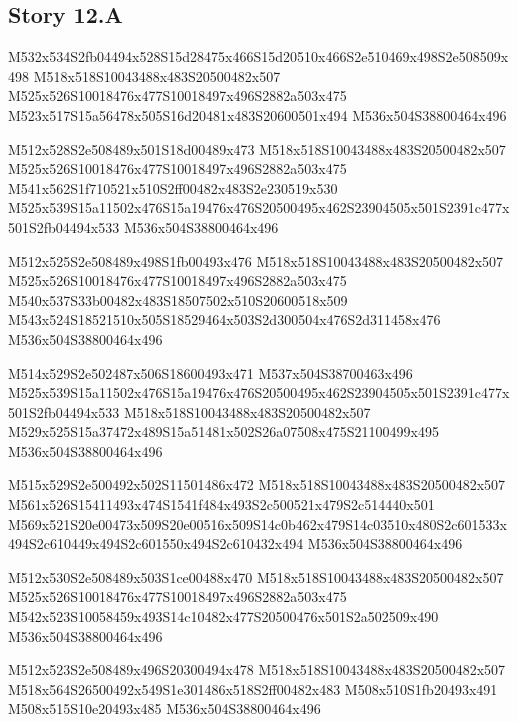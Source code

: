 \documentclass{article}
\begin{document}
\subsection{Story 12.A}

\begin{multicols}{5}
\begin{center}

M532x534S2fb04494x528S15d28475x466S15d20510x466S2e510469x498S2e508509x498 %
M518x518S10043488x483S20500482x507 %
M525x526S10018476x477S10018497x496S2882a503x475 %
M523x517S15a56478x505S16d20481x483S20600501x494 %
M536x504S38800464x496 %

M512x528S2e508489x501S18d00489x473 %
M518x518S10043488x483S20500482x507 %
M525x526S10018476x477S10018497x496S2882a503x475 %
M541x562S1f710521x510S2ff00482x483S2e230519x530 %
M525x539S15a11502x476S15a19476x476S20500495x462S23904505x501S2391c477x501S2fb04494x533 %
M536x504S38800464x496 %

M512x525S2e508489x498S1fb00493x476 %
M518x518S10043488x483S20500482x507 %
M525x526S10018476x477S10018497x496S2882a503x475 %
M540x537S33b00482x483S18507502x510S20600518x509 %
M543x524S18521510x505S18529464x503S2d300504x476S2d311458x476 %
M536x504S38800464x496 %

M514x529S2e502487x506S18600493x471 %
M537x504S38700463x496 %
M525x539S15a11502x476S15a19476x476S20500495x462S23904505x501S2391c477x501S2fb04494x533 %
M518x518S10043488x483S20500482x507 %
M529x525S15a37472x489S15a51481x502S26a07508x475S21100499x495 %
M536x504S38800464x496 %

M515x529S2e500492x502S11501486x472 %
M518x518S10043488x483S20500482x507 %
M561x526S15411493x474S1541f484x493S2c500521x479S2c514440x501 %
M569x521S20e00473x509S20e00516x509S14c0b462x479S14c03510x480S2c601533x494S2c610449x494S2c601550x494S2c610432x494 %
M536x504S38800464x496 %

M512x530S2e508489x503S1ce00488x470 %
M518x518S10043488x483S20500482x507 %
M525x526S10018476x477S10018497x496S2882a503x475 %
M542x523S10058459x493S14c10482x477S20500476x501S2a502509x490 %
M536x504S38800464x496 %

M512x523S2e508489x496S20300494x478 %
M518x518S10043488x483S20500482x507 %
M518x564S26500492x549S1e301486x518S2ff00482x483 %
M508x510S1fb20493x491 %
M508x515S10e20493x485 %
M536x504S38800464x496 %

\end{center}
\end{multicols}
\end{document}
